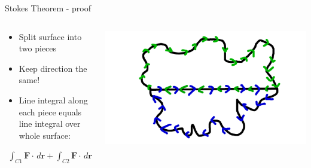 \documentclass[10pt,aspectratio=169,usenames,dvipsnames]{beamer}
\begin{document}
\begin{frame}{Stokes Theorem - proof}
\begin{columns}
\begin{column}{0.5\textwidth}
\begin{itemize}
    \item Split surface into two pieces
    \item Keep direction the same!
    \item Line integral along each piece equals line integral over whole surface:
\end{itemize}
\begin{gather}
    \int_{C1} \textbf{F} \cdot \,d\textbf{r}+\int_{C2} \textbf{F} \cdot \,d\textbf{r}=\int_C \textbf{F} \cdot \,d\textbf{r}
\end{gather}
\end{column}
\begin{column}{0.5\textwidth}
\includegraphics[width=0.8\linewidth]{2023StAndrews/surface2.png}
\end{column}
\end{columns}
\end{frame}
\end{document}
